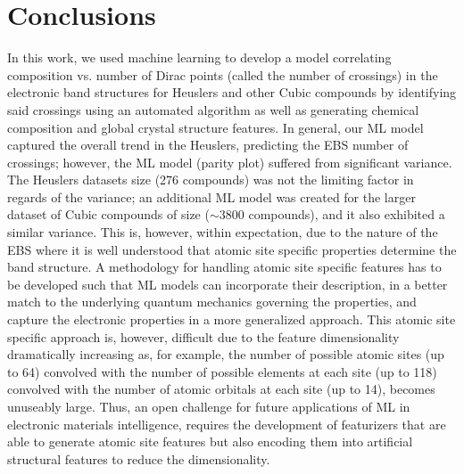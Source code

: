 \documentclass[article]{elsarticle}
\begin{document}
\section{Conclusions}
In this work, we used machine learning to develop a model correlating composition vs. number of Dirac points (called the number of crossings) in the electronic band structures for Heuslers and other Cubic compounds by identifying said crossings using an automated algorithm as well as generating chemical composition and global crystal structure features. In general, our ML model captured the overall trend in the Heuslers, predicting the EBS number of crossings; however, the ML model (parity plot) suffered from  significant variance. The Heuslers datasets size (\num{276} compounds) was not the limiting factor in regards of the variance; an additional ML model was created for the larger dataset of Cubic compounds of size ($\sim$\num{3800} compounds), and it also exhibited a similar variance. This is, however, within expectation, due to the nature of the EBS where it is well understood that atomic site specific properties determine the band structure. A methodology for handling atomic site specific features has to be developed such that ML models can incorporate their description, in a better match to the underlying quantum mechanics governing the properties, and capture the electronic properties in a more generalized approach. This atomic site specific approach is, however, difficult due to the feature dimensionality dramatically increasing as, for example, the number of possible atomic sites (up to 64) convolved with the number of possible elements at each site (up to 118) convolved with the number of atomic orbitals at each site (up to 14), becomes unuseably large. Thus, an open challenge for future applications of ML in electronic materials intelligence, requires the development of featurizers that are able to generate atomic site features but also encoding them into artificial structural features to reduce the dimensionality.




\end{document}
